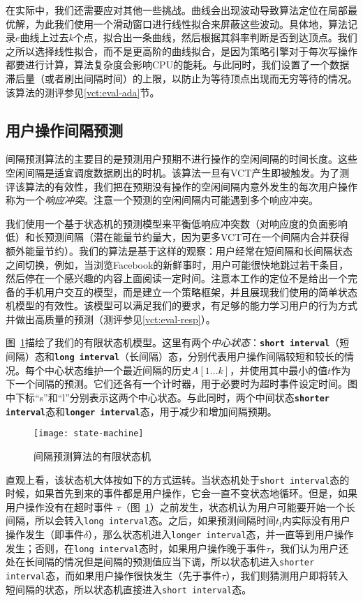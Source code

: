在实际中，我们还需要应对其他一些挑战。曲线会出现波动导致算法定位在局部最优解，为此我们使用一个滑动窗口进行线性拟合来屏蔽这些波动。具体地，算法记录$e$曲线上过去$k$个点，拟合出一条曲线，然后根据其斜率判断是否到达顶点。我们之所以选择线性拟合，而不是更高阶的曲线拟合，是因为策略引擎对于每次写操作都要进行计算，算法复杂度会影响CPU的能耗。与此同时，我们设置了一个数据滞后量（或者刷出间隔时间）的上限，以防止为等待顶点出现而无穷等待的情况。该算法的测评参见\ref{vct:eval-ada}节。

\subsection{用户操作间隔预测}
\label{vct:interval}

间隔预测算法的主要目的是预测用户预期不进行操作的空闲间隔的时间长度。这些空闲间隔是适宜调度数据刷出的时机。该算法一旦有VCT产生即被触发。为了测评该算法的有效性，我们把在预期没有操作的空闲间隔内意外发生的每次用户操作称为一个\emph{响应冲突}。注意一个预测的空闲间隔内可能遇到多个响应冲突。 
 
我们使用一个基于状态机的预测模型来平衡低响应冲突数（对响应度的负面影响低）和长预测间隔（潜在能量节约量大，因为更多VCT可在一个间隔内合并获得额外能量节约）。我们的算法是基于这样的观察：用户经常在短间隔和长间隔状态之间切换，例如，当浏览Facebook的新鲜事时，用户可能很快地跳过若干条目，然后停在一个感兴趣的内容上面阅读一定时间。注意本工作的定位不是给出一个完备的手机用户交互的模型，而是建立一个策略框架，并且展现我们使用的简单状态机模型的有效性。该模型可以满足我们的要求，有足够的能力学习用户的行为方式并做出高质量的预测（测评参见\ref{vct:eval-resp}）。

图~\ref{fig-state-machine}描绘了我们的有限状态机模型。这里有两个\emph{中心状态}：\textbf{\texttt{short interval}}（短间隔）态和\texttt{\textbf{long interval}}（长间隔）态，分别代表用户操作间隔较短和较长的情况。每个中心状态维护一个最近间隔的历史$A[1\ldots k]$，并使用其中最小的值$t$作为下一个间隔的预测。它们还各有一个计时器，用于必要时为超时事件设定时间。图中下标“s”和“l”分别表示这两个中心状态。与此同时，两个中间状态\texttt{\textbf{shorter interval}}态和\texttt{\textbf{longer
interval}}态，用于减少和增加间隔预期。

\begin{figure}[!h]
  \centering
  \texttt{[image: state-machine]}
  \caption{间隔预测算法的有限状态机}
  \label{fig-state-machine}
\end{figure}

直观上看，该状态机大体按如下的方式运转。当状态机处于\texttt{short interval}态的时候，如果首先到来的事件都是用户操作，它会一直不变状态地循环。但是，如果用户操作没有在超时事件
$\tau$（图~\ref{fig-state-machine}）之前发生，状态机认为用户可能要开始一个长间隔，所以会转入\texttt{long interval}态。之后，如果预测间隔时间$t_l$内实际没有用户操作发生（即事件$\delta$），那么状态机进入\texttt{longer interval}态，并一直等到用户操作发生；否则，在\texttt{long interval}态时，如果用户操作晚于事件$\tau$，我们认为用户还处在长间隔的情况但是间隔的预测值应当下调，所以状态机进入\texttt{shorter interval}态，而如果用户操作很快发生（先于事件$\tau$），我们则猜测用户即将转入短间隔的状态，所以状态机直接进入\texttt{short interval}态。


